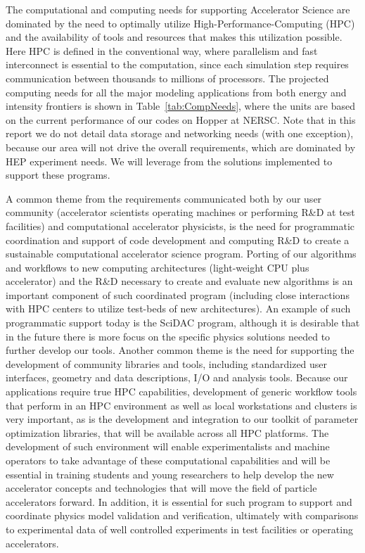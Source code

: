 The computational and computing needs for supporting Accelerator
Science are dominated by the need to optimally utilize
High-Performance-Computing (HPC) and the availability of tools
and resources that makes this utilization possible.  Here HPC is
defined in the conventional way, where parallelism and fast
interconnect is essential to the computation, since each
simulation step requires communication between thousands to
millions of processors. The projected computing  needs for all
the major modeling applications from both energy and intensity
frontiers is shown in Table~\ref{tab:CompNeeds}, where the units
are based on the current performance of our codes on Hopper at
NERSC. Note that in this report we do not detail data storage and
networking needs (with one exception), because our area will not
drive the overall requirements, which are dominated by HEP
experiment needs.  We will leverage from the solutions
implemented to support these programs.

A common theme from the requirements communicated both by our
user community (accelerator scientists operating machines or
performing R\&D at test facilities) and computational accelerator
physicists, is the need for programmatic coordination and support
of code development and computing R\&D to create a sustainable
computational accelerator science program.  Porting of our
algorithms and workflows to new computing architectures
(light-weight CPU plus accelerator) and the R\&D necessary to
create and evaluate new algorithms is an important component of
such coordinated program (including close interactions with HPC
centers to utilize test-beds of new architectures). An example of
such programmatic support today is the SciDAC program, although
it is desirable that in the future there is more focus on the
specific physics solutions needed to further develop our tools.  Another
common theme is the need for supporting the development of
community libraries and tools, including standardized user
interfaces, geometry and data descriptions, I/O and analysis tools.
Because our applications require true HPC capabilities,
development of generic workflow tools that perform in an HPC
environment as well as local workstations and clusters is very important, as is the development and
integration to our toolkit of parameter optimization libraries,
that will be available across all HPC platforms.  The development
of such environment will enable experimentalists and machine
operators to take advantage of these computational capabilities
and will be essential in training students and young researchers
to help develop the new accelerator concepts and technologies
that will move the field of particle accelerators forward.   In
addition, it is essential for such program to support and
coordinate physics model validation and verification, ultimately
with comparisons to experimental data of well controlled
experiments in test facilities or operating accelerators.


